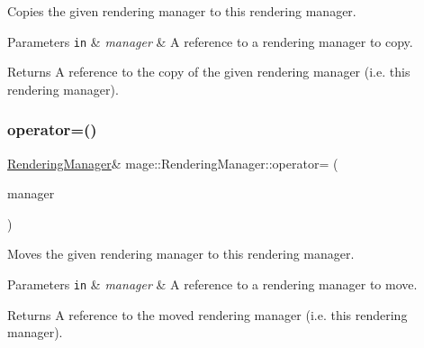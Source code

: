 Copies the given rendering manager to this rendering manager.


\begin{DoxyParams}[1]{Parameters}
\mbox{\tt in}  & {\em manager} & A reference to a rendering manager to copy. \\
\hline
\end{DoxyParams}
\begin{DoxyReturn}{Returns}
A reference to the copy of the given rendering manager (i.\+e. this rendering manager). 
\end{DoxyReturn}
\hypertarget{classmage_1_1_rendering_manager_a765f323c63ac7cd53c71b362eaccc61b}{}\label{classmage_1_1_rendering_manager_a765f323c63ac7cd53c71b362eaccc61b} 
\subsubsection{\texorpdfstring{operator=()}{operator=()}\hspace{0.1cm}{\footnotesize\ttfamily [2/2]}}
{\footnotesize\ttfamily \hyperlink{classmage_1_1_rendering_manager}{Rendering\+Manager}\& mage\+::\+Rendering\+Manager\+::operator= (\begin{DoxyParamCaption}\item[{\hyperlink{classmage_1_1_rendering_manager}{Rendering\+Manager} \&\&}]{manager }\end{DoxyParamCaption})\hspace{0.3cm}{\ttfamily [delete]}}

Moves the given rendering manager to this rendering manager.


\begin{DoxyParams}[1]{Parameters}
\mbox{\tt in}  & {\em manager} & A reference to a rendering manager to move. \\
\hline
\end{DoxyParams}
\begin{DoxyReturn}{Returns}
A reference to the moved rendering manager (i.\+e. this rendering manager). 
\end{DoxyReturn}
\hypertarget{classmage_1_1_rendering_manager_a45d4cadcd572290f352027b5fa86b4f6}{}\label{classmage_1_1_rendering_manager_a45d4cadcd572290f352027b5fa86b4f6} 
